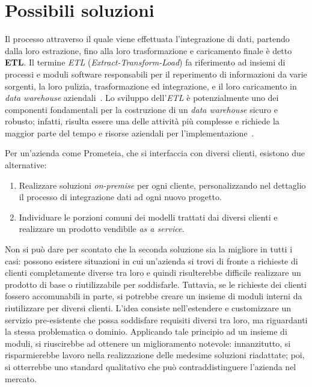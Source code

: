 \section{Possibili soluzioni}\label{sec:solutions}
Il processo attraverso il quale viene effettuata l'integrazione di dati, partendo dalla loro estrazione, fino alla loro trasformazione e caricamento finale è detto \textbf{ETL}.
Il termine \textit{ETL} (\textit{Extract-Transform-Load}) fa riferimento ad insiemi di processi e moduli software responsabili per il reperimento di informazioni da varie sorgenti, la loro pulizia, trasformazione ed integrazione, e il loro caricamento in \textit{data warehouse} aziendali~\cite{etl-def}.
Lo sviluppo dell'\textit{ETL} è potenzialmente uno dei componenti fondamentali per la costruzione di un \textit{data warehouse} sicuro e robusto;
infatti, risulta essere una delle attività più complesse e richiede la maggior parte del tempo e risorse aziendali per l'implementazione~\cite{etl-dwh}.

Per un'azienda come Prometeia, che si interfaccia con diversi clienti, esistono due alternative:
\begin{enumerate}
    \item Realizzare soluzioni \textit{on-premise} per ogni cliente, personalizzando nel dettaglio il processo di integrazione dati ad ogni nuovo progetto.
    \item Individuare le porzioni comuni dei modelli trattati dai diversi clienti e realizzare un prodotto vendibile \textit{as a service}.
\end{enumerate}
Non si può dare per scontato che la seconda soluzione sia la migliore in tutti i casi:
possono esistere situazioni in cui un'azienda si trovi di fronte a richieste di clienti completamente diverse tra loro e quindi risulterebbe difficile realizzare un prodotto di base o riutilizzabile per soddisfarle.
Tuttavia, se le richieste dei clienti fossero accomunabili in parte, si potrebbe creare un insieme di moduli interni da riutilizzare per diversi clienti.
L'idea consiste nell'estendere e customizzare un servizio pre-esistente che possa soddisfare requisiti diversi tra loro, ma riguardanti la stessa problematica o dominio.
Applicando tale principio ad un insieme di moduli, si riuscirebbe ad ottenere un miglioramento notevole:
innanzitutto, si risparmierebbe lavoro nella realizzazione delle medesime soluzioni riadattate;
poi, si otterrebbe uno standard qualitativo che può contraddistinguere l'azienda nel mercato.

